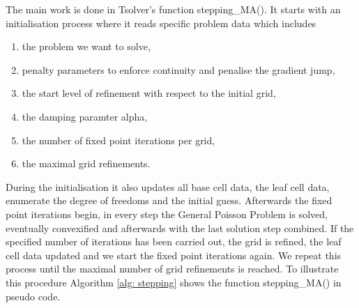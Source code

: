 The main work is done in Tsolver's function stepping\_MA(). It starts with an initialisation process where it reads specific problem data which includes
\begin{enumerate}
 \item  the problem we want to solve,
 \item penalty parameters to enforce continuity and penalise the gradient jump,
 \item the start level of refinement with respect to the initial grid,
 \item the damping paramter alpha,
 \item the number of fixed point iterations per grid,
 \item the maximal grid refinements.
\end{enumerate}
During the initialisation it also updates all base cell data, the leaf cell data, enumerate the degree of freedoms and the initial guess.
Afterwards the fixed point iterations begin, in every step the General Poisson Problem is solved, eventually convexified and afterwards with the last solution step combined. If the specified number of iterations has been carried out, the grid is refined, the leaf cell data updated and we start the fixed point iterations again.
We repeat this process until the maximal number of grid refinements is reached.
To illustrate this procedure Algorithm \ref{alg: stepping} shows the function stepping\_MA() in pseudo code.

